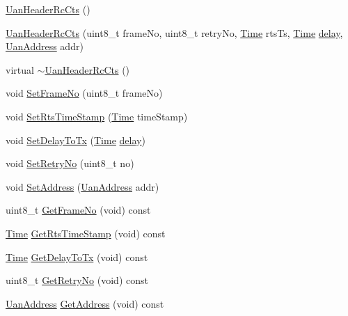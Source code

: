 \begin{DoxyCompactItemize}
\item 
\hyperlink{classns3_1_1UanHeaderRcCts_a38a11814b712bc9171e2d3a570abf099}{Uan\+Header\+Rc\+Cts} ()
\item 
\hyperlink{classns3_1_1UanHeaderRcCts_aad23aa16bcb8582a4d7549a3370a84fb}{Uan\+Header\+Rc\+Cts} (uint8\+\_\+t frame\+No, uint8\+\_\+t retry\+No, \hyperlink{classns3_1_1Time}{Time} rts\+Ts, \hyperlink{classns3_1_1Time}{Time} \hyperlink{mmwave_2model_2fading-traces_2fading__trace__generator_8m_a7964e6aa8f61a9d28973c8267a606ad8}{delay}, \hyperlink{classns3_1_1UanAddress}{Uan\+Address} addr)
\item 
virtual \hyperlink{classns3_1_1UanHeaderRcCts_a1c9be59bc9a7e464c6a0ad4385066c50}{$\sim$\+Uan\+Header\+Rc\+Cts} ()
\item 
void \hyperlink{classns3_1_1UanHeaderRcCts_a4741c7c3695cf323a5d1d4a600b84038}{Set\+Frame\+No} (uint8\+\_\+t frame\+No)
\item 
void \hyperlink{classns3_1_1UanHeaderRcCts_a2cd05e7b5371f32a9138c26a97a67341}{Set\+Rts\+Time\+Stamp} (\hyperlink{classns3_1_1Time}{Time} time\+Stamp)
\item 
void \hyperlink{classns3_1_1UanHeaderRcCts_a6473716bd8ca3703314a685254694cd9}{Set\+Delay\+To\+Tx} (\hyperlink{classns3_1_1Time}{Time} \hyperlink{mmwave_2model_2fading-traces_2fading__trace__generator_8m_a7964e6aa8f61a9d28973c8267a606ad8}{delay})
\item 
void \hyperlink{classns3_1_1UanHeaderRcCts_adea1781f000478b55d557a6685171644}{Set\+Retry\+No} (uint8\+\_\+t no)
\item 
void \hyperlink{classns3_1_1UanHeaderRcCts_a21093c1c096b7197544ae80384ca281e}{Set\+Address} (\hyperlink{classns3_1_1UanAddress}{Uan\+Address} addr)
\item 
uint8\+\_\+t \hyperlink{classns3_1_1UanHeaderRcCts_a6671e728bd425e851f50b127e27ce736}{Get\+Frame\+No} (void) const 
\item 
\hyperlink{classns3_1_1Time}{Time} \hyperlink{classns3_1_1UanHeaderRcCts_aadb1dad73d29e73b708daa1ec15a6817}{Get\+Rts\+Time\+Stamp} (void) const 
\item 
\hyperlink{classns3_1_1Time}{Time} \hyperlink{classns3_1_1UanHeaderRcCts_a6e26df1fe9e246ba938b94f9af404718}{Get\+Delay\+To\+Tx} (void) const 
\item 
uint8\+\_\+t \hyperlink{classns3_1_1UanHeaderRcCts_af5a79e9668b3678f400cf815df4a5d94}{Get\+Retry\+No} (void) const 
\item 
\hyperlink{classns3_1_1UanAddress}{Uan\+Address} \hyperlink{classns3_1_1UanHeaderRcCts_a4399b10f7083d9edab62d463ab616423}{Get\+Address} (void) const 

\end{DoxyCompactItemize}
